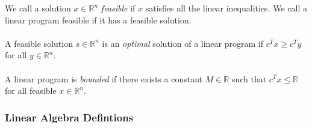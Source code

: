 \documentclass[a4paper,12pt]{scrartcl}
\theoremstyle{definition}
\theoremstyle{remark}
\begin{document}
We call a solution $x \in \mathbb{R}^n$ \emph{feasible} if $x$
satisfies all the linear inequalities.  We call a linear program
feasible if it has a feasible solution.
\\
\\
A feasible solution $s \in \mathbb{R}^n$ is an \emph{optimal} solution
of a linear program if $c^T x \geq c^T y $ for all $y\in \mathbb{R}^n$.
\\
\\
A linear program is \emph{bounded} if there exists a constant $M\in
\mathbb{R}$ such that $c^T x \leq \mathbb{R}$ for all feasible
$x \in \mathbb{R}^n$.

\subsubsection{Linear Algebra Defintions}
\end{document}
